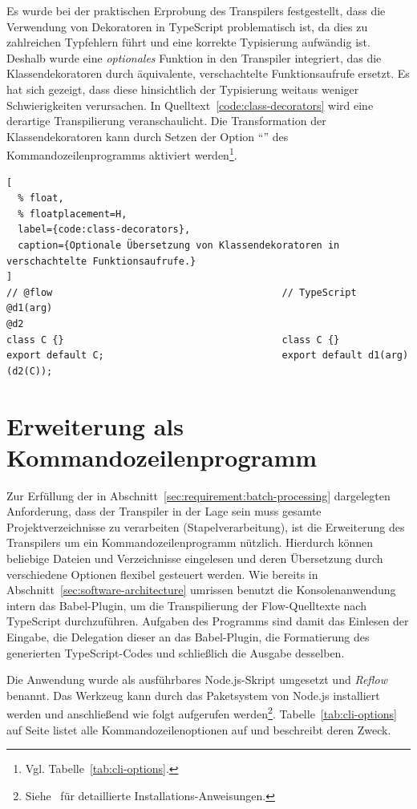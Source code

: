 Es wurde bei der praktischen Erprobung des Transpilers festgestellt, dass die Verwendung von Dekoratoren in TypeScript problematisch ist, da dies zu zahlreichen Typfehlern führt und eine korrekte Typisierung aufwändig ist. Deshalb wurde eine \emph{optionales} Funktion in den Transpiler integriert, das die Klassendekoratoren durch äquivalente, verschachtelte Funktionsaufrufe ersetzt. Es hat sich gezeigt, dass diese hinsichtlich der Typisierung weitaus weniger Schwierigkeiten verursachen. In Quelltext~\ref{code:class-decorators} wird eine derartige Transpilierung veranschaulicht. Die Transformation der Klassendekoratoren kann durch Setzen der Option \enquote{} des Kommandozeilenprogramms aktiviert werden\footnote{Vgl. Tabelle~\ref{tab:cli-options}.}.

\begin{lstlisting}[
  % float,
  % floatplacement=H,
  label={code:class-decorators},
  caption={Optionale Übersetzung von Klassendekoratoren in verschachtelte Funktionsaufrufe.}
]
// @flow                                        // TypeScript
@d1(arg)
@d2
class C {}                                      class C {}
export default C;                               export default d1(arg)(d2(C));
\end{lstlisting}

\section{Erweiterung als Kommandozeilenprogramm}
\label{sec:cli-program}

Zur Erfüllung der in Abschnitt~\ref{sec:requirement:batch-processing} dargelegten Anforderung, dass der Transpiler in der Lage sein muss gesamte Projektverzeichnisse zu verarbeiten (Stapelverarbeitung), ist die Erweiterung des Transpilers um ein Kommandozeilenprogramm nützlich. Hierdurch können beliebige Dateien und Verzeichnisse eingelesen und deren Übersetzung durch verschiedene Optionen flexibel gesteuert werden. Wie bereits in Abschnitt~\ref{sec:software-architecture} umrissen benutzt die Konsolenanwendung intern das Babel-Plugin, um die Transpilierung der Flow-Quelltexte nach TypeScript durchzuführen. Aufgaben des Programms sind damit das Einlesen der Eingabe, die Delegation dieser an das Babel-Plugin, die Formatierung des generierten TypeScript-Codes und schließlich die Ausgabe desselben.

Die Anwendung wurde als ausführbares Node.js-Skript umgesetzt und \textit{Reflow} benannt. Das Werkzeug kann durch das Paketsystem von Node.js installiert werden und anschließend wie folgt aufgerufen werden\footnote{Siehe~\autocite{REFLOW_GITHUB} für detaillierte Installations-Anweisungen.}. Tabelle~\ref{tab:cli-options} auf Seite \pageref{tab:cli-options} listet alle Kommandozeilenoptionen auf und beschreibt deren Zweck.

